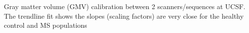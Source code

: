 \label{fig:hcms_GMV} Gray matter volume (GMV) calibration between 2 scanners/sequences at UCSF. The trendline fit shows the slopes (scaling factors) are very close for the healthy control and MS populations
